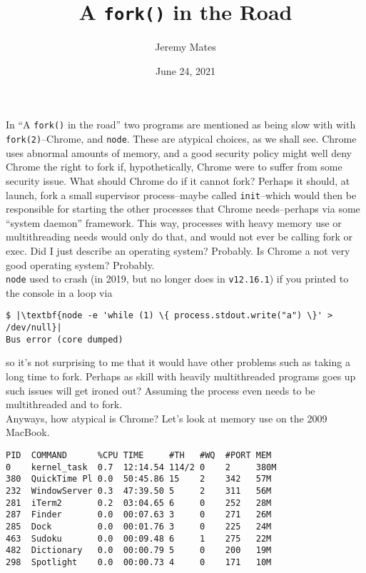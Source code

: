 \documentclass[10pt,a4paper]{article}
\title{A \texttt{fork()} in the Road}
\author{Jeremy Mates}
\date{June 24, 2021}
\begin{document}

\maketitle

In ``A \texttt{fork()} in the road''\cite{Hotos2019} two programs are
mentioned as being slow with with \texttt{fork(2)}--Chrome, and
\texttt{node}. These are atypical choices, as we shall see. Chrome uses
abnormal amounts of memory, and a good security policy might well deny
Chrome the right to fork if, hypothetically, Chrome were to suffer from
some security issue. What should Chrome do if it cannot fork? Perhaps it
should, at launch, fork a small supervisor process--maybe called
\texttt{init}--which would then be responsible for starting the other
processes that Chrome needs--perhaps via some ``system daemon''
framework. This way, processes with heavy memory use or multithreading
needs would only do that, and would not ever be calling fork or exec.
Did I just describe an operating system? Probably. Is Chrome a not very
good operating system? Probably. \\

\texttt{node} used to crash (in 2019, but no longer does in
\texttt{v12.16.1}) if you printed to the console in a loop via

\begin{lstlisting}
$ |\textbf{node -e 'while (1) \{ process.stdout.write("a") \}' > /dev/null}|
Bus error (core dumped)
\end{lstlisting}

so it's not surprising to me that it would have other problems such as
taking a long time to fork. Perhaps as skill with heavily multithreaded
programs goes up such issues will get ironed out? Assuming the process
even needs to be multithreaded and to fork. \\

Anyways, how atypical is Chrome? Let's look at memory use on the 2009
MacBook.

\begin{lstlisting}
PID  COMMAND      %CPU TIME     #TH   #WQ  #PORT MEM
0    kernel_task  0.7  12:14.54 114/2 0    2     380M
380  QuickTime Pl 0.0  50:45.86 15    2    342   57M
232  WindowServer 0.3  47:39.50 5     2    311   56M
281  iTerm2       0.2  03:04.65 6     0    252   28M
287  Finder       0.0  00:07.63 3     0    271   26M
285  Dock         0.0  00:01.76 3     0    225   24M
463  Sudoku       0.0  00:09.48 6     1    275   22M
482  Dictionary   0.0  00:00.79 5     0    200   19M
298  Spotlight    0.0  00:00.73 4     0    171   10M
\end{lstlisting}
\end{document}
